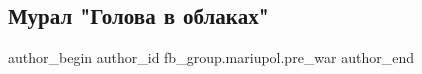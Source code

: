  
 
 
 
 

\subsection{Мурал "Голова в облаках"}
\label{sec:15_02_2023.fb.fb_group.mariupol.pre_war.1.mural__golova_v_obla}

\ifcmt
 author_begin
   author_id fb_group.mariupol.pre_war
 author_end
\fi
